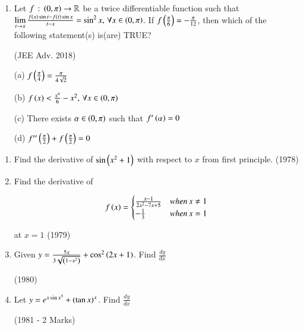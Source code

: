 \documentclass[journal,12pt,twocolumn]{IEEEtran}
\theoremstyle{remark}
\begin{document}
\begin{enumerate}
(b) $\sum\limits_{j=1}^{10}\brak{1+f_{j}^{\prime}\brak{0}}\brak{\sec^{2}\brak{f_{j}\brak{0}}}=10$

(c) For any fixed positive integer $n$, $\lim\limits_{x\to\infty}\tan\brak{f_{n}\brak{x}}=\frac{1}{n}$

(d) For any fixed positive integer $n$, $\lim\limits_{x\to\infty}\sec^{2}\brak{f_{n}\brak{x}}=1$

\item 
Let $f\,:\,\left(0,\pi\right)\to\mathbb{R}$ be a twice differentiable function such that ${\lim\limits_{t\to x}\frac{f\left(x\right)\sin t-f\left(t\right)\sin x}{t-x}=\sin^{2}x,\,\forall x\in\left(0,\pi\right)}$. If $f\left(\frac{\pi}{6}\right)=-\frac{\pi}{12}$, then which of the following statement(s) is(are) TRUE? 

\hfill{(JEE Adv. 2018)}

(a) $f\left(\frac{\pi}{4}\right)=\frac{\pi}{4\sqrt{2}}$

(b) $f\left(x\right)<\frac{x^{4}}{6}-x^{2},\,\forall x\in\left(0,\pi\right)$

(c) There exists $\alpha\in\left(0,\pi\right)$ such that $f^{\prime}\left(\alpha\right)=0$

(d) $f^{\prime\prime}\left(\frac{\pi}{2}\right)+f\left(\frac{\pi}{2}\right)=0$
\end{enumerate}

\begin{enumerate}

\item 
Find the derivative of $\sin\left(x^{2}+1\right)$ with respect to $x$ from first principle. \hfill{(1978)}

\item 
Find the derivative of

\begin{equation}
f\left(x\right) =
\begin{cases}
\frac{x-1}{2x^{2}-7x+5} & when\,x\not=1\\

-\frac{1}{3} & when\,x=1\\
\end{cases}
\end{equation}

at $x=1$ \hfill{(1979)}

\item 
Given $y=\frac{5x}{3\sqrt{\left(1-x^{2}\right)}}+\cos^{2}\left(2x+1\right)$. Find $\frac{dy}{dx}$

\hfill{(1980)}

\item 
Let $y=e^{x\sin x^{3}}+\left(\tan x\right)^{x}$. Find $\frac{dy}{dx}$ 

\hfill{(1981 - 2 Marks)}

\end{enumerate}
\end{document}
